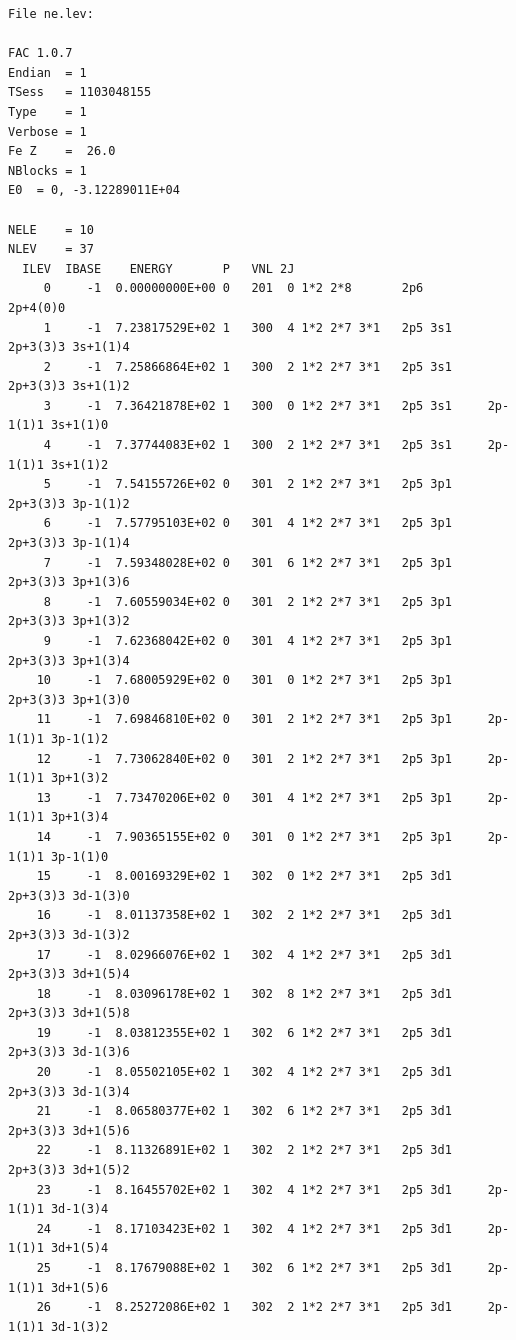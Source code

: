 \documentclass[twoside,letterpaper]{refrep}
\begin{document}
\begin{verbatim}
File ne.lev:

FAC 1.0.7
Endian	= 1
TSess	= 1103048155
Type	= 1
Verbose	= 1
Fe Z	=  26.0
NBlocks	= 1
E0	= 0, -3.12289011E+04

NELE	= 10
NLEV	= 37
  ILEV  IBASE    ENERGY       P   VNL 2J
     0     -1  0.00000000E+00 0   201  0 1*2 2*8       2p6         2p+4(0)0 
     1     -1  7.23817529E+02 1   300  4 1*2 2*7 3*1   2p5 3s1     2p+3(3)3 3s+1(1)4 
     2     -1  7.25866864E+02 1   300  2 1*2 2*7 3*1   2p5 3s1     2p+3(3)3 3s+1(1)2 
     3     -1  7.36421878E+02 1   300  0 1*2 2*7 3*1   2p5 3s1     2p-1(1)1 3s+1(1)0 
     4     -1  7.37744083E+02 1   300  2 1*2 2*7 3*1   2p5 3s1     2p-1(1)1 3s+1(1)2 
     5     -1  7.54155726E+02 0   301  2 1*2 2*7 3*1   2p5 3p1     2p+3(3)3 3p-1(1)2 
     6     -1  7.57795103E+02 0   301  4 1*2 2*7 3*1   2p5 3p1     2p+3(3)3 3p-1(1)4 
     7     -1  7.59348028E+02 0   301  6 1*2 2*7 3*1   2p5 3p1     2p+3(3)3 3p+1(3)6 
     8     -1  7.60559034E+02 0   301  2 1*2 2*7 3*1   2p5 3p1     2p+3(3)3 3p+1(3)2 
     9     -1  7.62368042E+02 0   301  4 1*2 2*7 3*1   2p5 3p1     2p+3(3)3 3p+1(3)4 
    10     -1  7.68005929E+02 0   301  0 1*2 2*7 3*1   2p5 3p1     2p+3(3)3 3p+1(3)0 
    11     -1  7.69846810E+02 0   301  2 1*2 2*7 3*1   2p5 3p1     2p-1(1)1 3p-1(1)2 
    12     -1  7.73062840E+02 0   301  2 1*2 2*7 3*1   2p5 3p1     2p-1(1)1 3p+1(3)2 
    13     -1  7.73470206E+02 0   301  4 1*2 2*7 3*1   2p5 3p1     2p-1(1)1 3p+1(3)4 
    14     -1  7.90365155E+02 0   301  0 1*2 2*7 3*1   2p5 3p1     2p-1(1)1 3p-1(1)0 
    15     -1  8.00169329E+02 1   302  0 1*2 2*7 3*1   2p5 3d1     2p+3(3)3 3d-1(3)0 
    16     -1  8.01137358E+02 1   302  2 1*2 2*7 3*1   2p5 3d1     2p+3(3)3 3d-1(3)2 
    17     -1  8.02966076E+02 1   302  4 1*2 2*7 3*1   2p5 3d1     2p+3(3)3 3d+1(5)4 
    18     -1  8.03096178E+02 1   302  8 1*2 2*7 3*1   2p5 3d1     2p+3(3)3 3d+1(5)8 
    19     -1  8.03812355E+02 1   302  6 1*2 2*7 3*1   2p5 3d1     2p+3(3)3 3d-1(3)6 
    20     -1  8.05502105E+02 1   302  4 1*2 2*7 3*1   2p5 3d1     2p+3(3)3 3d-1(3)4 
    21     -1  8.06580377E+02 1   302  6 1*2 2*7 3*1   2p5 3d1     2p+3(3)3 3d+1(5)6 
    22     -1  8.11326891E+02 1   302  2 1*2 2*7 3*1   2p5 3d1     2p+3(3)3 3d+1(5)2 
    23     -1  8.16455702E+02 1   302  4 1*2 2*7 3*1   2p5 3d1     2p-1(1)1 3d-1(3)4 
    24     -1  8.17103423E+02 1   302  4 1*2 2*7 3*1   2p5 3d1     2p-1(1)1 3d+1(5)4 
    25     -1  8.17679088E+02 1   302  6 1*2 2*7 3*1   2p5 3d1     2p-1(1)1 3d+1(5)6 
    26     -1  8.25272086E+02 1   302  2 1*2 2*7 3*1   2p5 3d1     2p-1(1)1 3d-1(3)2 

\end{verbatim}
\end{document}
